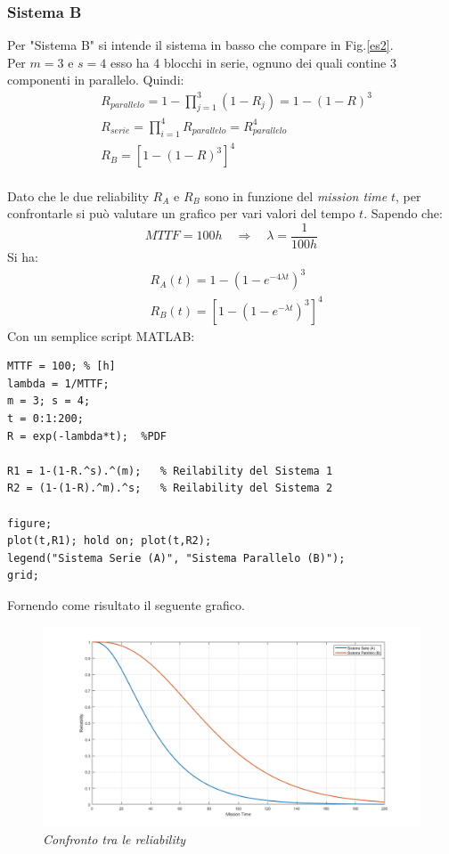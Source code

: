 \subsubsection{Sistema B}
Per "Sistema B" si intende il sistema in basso che compare in Fig.\ref{es2}.
\\Per $m=3$ e $s=4$ esso ha 4 blocchi in serie, ognuno dei quali contine 3 componenti in parallelo. Quindi:
\begin{equation*}
	\begin{split}
		&R_{parallelo} = 1 - \prod_{j=1}^{3}(1-R_{j}) = 1-(1-R)^3 \\
		&R_{serie} = \prod_{i=1}^{4}R_{parallelo} = R_{parallelo}^4 \\
		&R_B = [1-(1-R)^3]^4
	\end{split}
\end{equation*}
\vspace{0.5cm}
\\Dato che le due reliability $R_A$ e $R_B$ sono in funzione del \textit{mission time} $t$, per confrontarle si può valutare un grafico per vari valori del tempo $t$.
Sapendo che:
\begin{equation*}
	MTTF = 100h \quad \Rightarrow \quad \lambda = \dfrac{1}{100h}
\end{equation*}
Si ha:
\begin{equation}
	\begin{split}
			&R_A(t) = 1 - (1 - e^{-4\lambda t})^3 \\
			&R_B(t) = [1-(1-e^{-\lambda t})^3]^4
	\end{split}
\end{equation}
Con un semplice script MATLAB:
\begin{verbatim}
MTTF = 100; % [h]
lambda = 1/MTTF;
m = 3; s = 4;
t = 0:1:200;
R = exp(-lambda*t);  %PDF

R1 = 1-(1-R.^s).^(m);   % Reilability del Sistema 1
R2 = (1-(1-R).^m).^s;   % Reilability del Sistema 2

figure;
plot(t,R1); hold on; plot(t,R2);
legend("Sistema Serie (A)", "Sistema Parallelo (B)");
grid;
\end{verbatim}
Fornendo come risultato il seguente grafico.
\begin{figure}[H]
	\centering
	\includegraphics[width=\textwidth]{img/hw5/es2_grafico1.png}
	\caption{\textit{Confronto tra le reliability}}
\end{figure}
